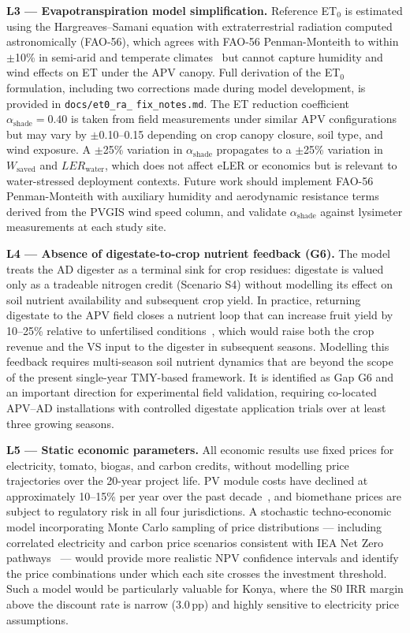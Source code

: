 \textbf{L3 --- Evapotranspiration model simplification.}
Reference ET$_0$ is estimated using the Hargreaves--Samani equation
with extraterrestrial radiation computed astronomically (FAO-56),
which agrees with FAO-56 Penman-Monteith to within $\pm$10\% in
semi-arid and temperate climates~\citep{droogers2002} but cannot
capture humidity and wind effects on ET under the APV canopy. Full
derivation of the ET$_0$ formulation, including two corrections made
during model development, is provided in \texttt{docs/et0\_ra\_}
\texttt{fix\_notes.md}.
The ET reduction coefficient $\alpha_{\text{shade}} = 0.40$ is
taken from field measurements under similar APV configurations
\citep{elamri2018, tawassulli2025} but may vary by $\pm$0.10--0.15
depending on crop canopy closure, soil type, and wind exposure.
A $\pm$25\% variation in $\alpha_{\text{shade}}$ propagates to a
$\pm$25\% variation in $W_{\text{saved}}$ and $LER_{\text{water}}$,
which does not affect eLER or economics but is relevant to
water-stressed deployment contexts. Future work should implement
FAO-56 Penman-Monteith with auxiliary humidity and aerodynamic
resistance terms derived from the PVGIS wind speed column, and
validate $\alpha_{\text{shade}}$ against lysimeter measurements
at each study site.

\textbf{L4 --- Absence of digestate-to-crop nutrient feedback (G6).}
The model treats the AD digester as a terminal sink for crop
residues: digestate is valued only as a tradeable nitrogen credit
(Scenario S4) without modelling its effect on soil nutrient
availability and subsequent crop yield. In practice, returning
digestate to the APV field closes a nutrient loop that can
increase fruit yield by 10--25\% relative to unfertilised
conditions~\citep{lallement2023}, which would raise both the
crop revenue and the VS input to the digester in subsequent
seasons. Modelling this feedback requires multi-season soil
nutrient dynamics that are beyond the scope of the present
single-year TMY-based framework. It is identified as Gap G6
and an important direction for experimental field
validation, requiring co-located APV--AD installations with
controlled digestate application trials over at least three
growing seasons.

\textbf{L5 --- Static economic parameters.}
All economic results use fixed prices for electricity, tomato,
biogas, and carbon credits, without modelling price trajectories
over the 20-year project life. PV module costs have declined at
approximately 10--15\% per year over the past decade~\citep{irena2022},
and biomethane prices are subject to regulatory risk in all four
jurisdictions. A stochastic techno-economic model incorporating
Monte Carlo sampling of price distributions --- including correlated
electricity and carbon price scenarios consistent with IEA
Net Zero pathways~\citep{iea2025} --- would provide more realistic
NPV confidence intervals and identify the price combinations
under which each site crosses the investment threshold.
Such a model would be particularly valuable for Konya, where
the S0 IRR margin above the discount rate is narrow (3.0\,pp)
and highly sensitive to electricity price assumptions.

